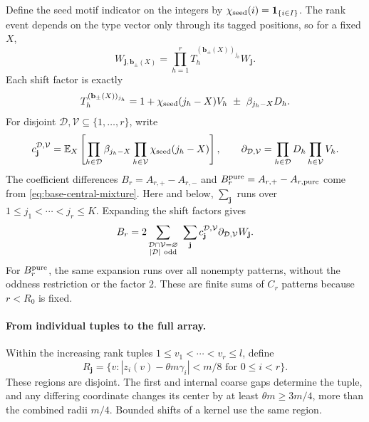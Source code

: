 Define the seed motif indicator on the integers by
\(\chi_{\rm seed}(i)={\bf1}_{\{i\in I\}}\). The rank event depends on the type vector only through its tagged positions, so for a fixed \(X\),
\[
 W_{\mathbf j,\mathbf b_\pm(X)}
 =\prod_{h=1}^r T_h^{(\mathbf b_\pm(X))_{j_h}}W_{\mathbf j}.
\]
Each shift factor is exactly
\[
 T_h^{(\mathbf b_\pm(X))_{j_h}}
 =1+\chi_{\rm seed}(j_h-X)V_h
       \ \pm\ \beta_{j_h-X}D_h.
\]
For disjoint \(\mathcal D,\mathcal V\subseteq\{1,\ldots,r\}\), write
\[
 c_{\mathbf j}^{\mathcal D,\mathcal V}
 =\mathbb E_X\left[
       \prod_{h\in\mathcal D}\beta_{j_h-X}
       \prod_{h\in\mathcal V}\chi_{\rm seed}(j_h-X)\right],
 \qquad
 \partial_{\mathcal D,\mathcal V}
 =\prod_{h\in\mathcal D}D_h\prod_{h\in\mathcal V}V_h.
\]
The coefficient differences
\(B_r=A_{r,+}-A_{r,-}\) and
\(B_r^{\rm pure}=A_{r,+}-A_{r,\rm pure}\) come from
\eqref{eq:base-central-mixture}. Here and below, \(\sum_{\mathbf j}\) runs over \(1\le j_1<\cdots<j_r\le K\). Expanding the shift factors gives
\begin{equation}\label{eq:base-pattern-expansion}
 B_r
 =2\sum_{\substack{\mathcal D\cap\mathcal V=\varnothing\\
                    |\mathcal D|\ {\rm odd}}}
       \ \sum_{\mathbf j}
       c_{\mathbf j}^{\mathcal D,\mathcal V}
       \partial_{\mathcal D,\mathcal V}W_{\mathbf j}.
\end{equation}
For \(B_r^{\rm pure}\), the same expansion runs over all nonempty patterns, without the oddness restriction or the factor \(2\). These are finite sums of \(C_r\) patterns because \(r<R_0\) is fixed.

\paragraph{From individual tuples to the full array.}
Within the increasing rank tuples \(1\le v_1<\cdots<v_r\le l\), define
\[
 R_{\mathbf j}
 =\{v:|z_i(v)-\theta m\gamma_i|<m/8
           \text{ for }0\le i<r\}.
\]
These regions are disjoint. The first and internal coarse gaps determine the tuple, and any differing coordinate changes its center by at least \(\theta m\ge3m/4\), more than the combined radii \(m/4\). Bounded shifts of a kernel use the same region.


